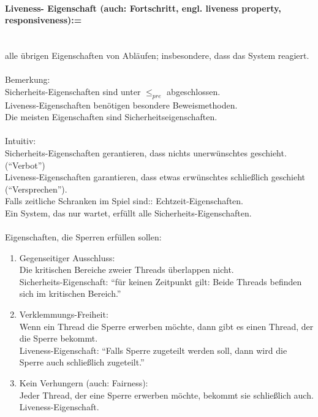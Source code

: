 \documentclass[a4paper,12pt]{scrartcl}
\begin{document}
 \paragraph{Liveness- Eigenschaft (auch: Fortschritt, engl. liveness property, responsiveness):=}\quad\\
 alle übrigen Eigenschaften von Abläufen; insbesondere, dass das System reagiert.\\
 \\
 Bemerkung:\\ 
 Sicherheits-Eigenschaften sind unter $\leq_{pre}$ abgeschlossen.\\
 Liveness-Eigenschaften benötigen besondere Beweismethoden.\\
 Die meisten Eigenschaften sind Sicherheitseigenschaften.\\
 \\
 Intuitiv:\\
 Sicherheits-Eigenschaften gerantieren, dass nichts unerwünschtes geschieht. ("`Verbot"')\\
 Liveness-Eigenschaften garantieren, dass etwas erwünschtes schließlich geschieht ("`Versprechen"').\\
 Falls zeitliche Schranken im Spiel sind:: Echtzeit-Eigenschaften.\\
 Ein System, das nur wartet, erfüllt alle Sicherheits-Eigenschaften.\\
 \\
 Eigenschaften, die Sperren erfüllen sollen:
 \begin{enumerate}
  \item Gegenseitiger Ausschluss:\\
  Die kritischen Bereiche zweier Threads überlappen nicht.\\
  Sicherheits-Eigenschaft: "`für keinen Zeitpunkt gilt: Beide Threads befinden sich im kritischen Bereich."'
  \item Verklemmungs-Freiheit:\\
  Wenn ein Thread die Sperre erwerben möchte, dann gibt es einen Thread, der die Sperre bekommt.\\
  Liveness-Eigenschaft: "`Falls Sperre zugeteilt werden soll, dann wird die Sperre auch schließlich zugeteilt."'
  \item Kein Verhungern (auch: Fairness):\\
  Jeder Thread, der eine Sperre erwerben möchte, bekommt sie schließlich auch.\\
  Liveness-Eigenschaft.
 \end{enumerate}
\end{document}
